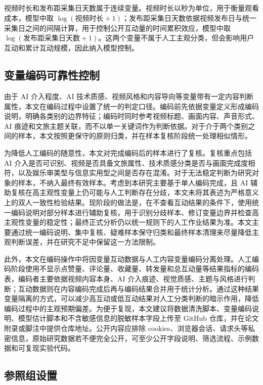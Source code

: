 视频时长和发布距采集日天数属于连续变量。视频时长以秒为单位，用于衡量观看成本，模型中取 $\log(\text{视频时长}+1)$；发布距采集日天数依据视频发布日与统一采集日之间的间隔计算，用于控制公开互动量的时间累积效应，模型中取 $\log(\text{发布距采集日天数}+1)$。这两个变量不属于人工主观分类，但会影响用户互动和累计互动规模，因此纳入模型控制。

\subsection{变量编码可靠性控制}

由于 AI 介入程度、AI 技术质感、视频风格和内容导向等变量带有一定内容判断属性，本文在编码过程中设置了统一的判定口径。编码前先依据变量定义形成编码说明，明确各类别的边界特征；编码时同时参考视频标题、画面内容、声音形式、AI 痕迹和文旅主题关联，而不以单一关键词作为判断依据。对于介于两个类别之间的样本，本文按照更保守的原则归类，并在样本复核阶段统一处理相似情形。

为降低人工编码的随意性，本文对完成编码后的样本进行了复核。复核重点包括 AI 介入是否可识别、视频是否具备文旅属性、技术质感分类是否与画面完成度相符，以及娱乐审美型与信息实用型之间是否存在混淆。对于无法稳定判断为研究对象的样本，不纳入最终有效样本。考虑到本研究主要基于单人编码完成，且 AI 辅助复核在高主观性变量上仍可能与人工判断存在分歧，本文未将其表述为严格意义上的双人一致性检验结果。现阶段的做法是，在不查看互动结果的条件下，使用统一编码说明对部分样本进行辅助复核，用于识别分歧样本、修订变量边界并检查高主观性变量的稳定性；最终正式分析仍以统一规则下的人工作业结果为准。本文主要通过统一编码说明、集中复核、疑难样本保守归类和最终样本清理来尽量降低主观判断误差，并在研究不足中保留这一方法限制。

此外，本文在编码操作中将因变量互动数据与人工内容变量编码分离处理。人工编码阶段使用不显示点赞量、评论量、收藏量、转发量和总互动量等结果指标的编码表，编码者主要依据视频内容本身、AI 介入痕迹、视觉质感、主题与风格进行判断；互动数据则在内容编码完成后再与编码结果合并用于统计分析。通过这种结果变量隔离的方式，可以减少高互动或低互动结果对人工分类判断的暗示作用，降低编码过程中的主观预期偏差。为便于复现，本文建议将数据清洗脚本、变量编码说明、模型估计脚本和不含敏感信息的脱敏样本字段上传至 GitHub 仓库，并在论文附录或脚注中提供仓库地址。公开内容应排除 cookies、浏览器会话、请求头等私密信息，原始研究数据若不便完全公开，可至少公开字段说明、筛选流程、示例数据和可复现实验代码。

\subsection{参照组设置}

